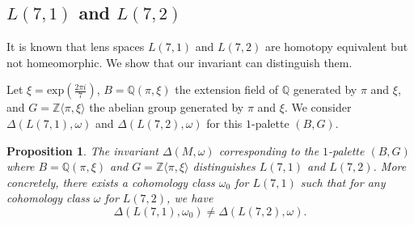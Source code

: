 \documentclass[12pt]{amsart}
\newtheorem{prop}[theo]{Proposition}
\begin{document}
\subsection{$L(7, 1)$ and $L(7, 2)$}
It is known that lens spaces $L(7, 1)$ and $L(7, 2)$ are homotopy equivalent but not homeomorphic. We show that our invariant can distinguish them.

Let $\xi=\mathrm{exp}(\frac{2\pi i}{7})$, $B=\mathbb{Q}(\pi, \xi)$ the extension field of $\mathbb{Q}$ generated by $\pi$ and $\xi$, and $G=\mathbb{Z}\langle \pi, \xi \rangle$ the abelian group generated by $\pi$ and $\xi$. We consider $\Delta (L(7, 1), \omega)$ and $\Delta (L(7, 2), \omega)$ for this $1$-palette $(B, G)$.

\begin{prop}\label{Prop5152}
The invariant $\Delta (M, \omega)$ corresponding to the $1$-palette $(B, G)$ where $B=\mathbb{Q}(\pi, \xi)$ and $G=\mathbb{Z}\langle \pi, \xi \rangle$ distinguishes $L(7, 1)$ and $L(7, 2)$.  
More concretely, there exists a cohomology class $\omega_0$ for $L(7, 1)$ such that for any cohomology class $\omega$ for $L(7, 2)$, we have 
\[
\Delta (L(7, 1), \omega_0)  \neq \Delta (L(7, 2), \omega).  
\]
\end{prop}
\end{document}
